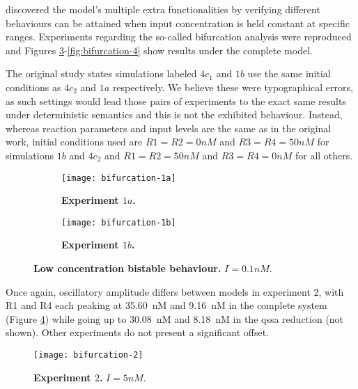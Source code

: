    \citet{multif} discovered the model's multiple extra functionalities by verifying different behaviours can be attained when input concentration is held constant at specific ranges.
    Experiments regarding the so-called bifurcation analysis were reproduced and Figures \ref{fig:bifurcation-1}-\ref{fig:bifurcation-4} show results under the complete model.

    The original study states simulations labeled $4c_{1}$ and $1b$ use the same initial conditions as $4c_{2}$ and $1a$ respectively.
    We believe these were typographical errors, as such settings would lead those pairs of experiments to the exact same results under deterministic semantics and this is not the exhibited behaviour.
    Instead, whereas reaction parameters and input levels are the same as in the original work, initial conditions used are $R1=R2=0nM$ and $R3=R4=50nM$ for simulations $1b$ and $4c_{2}$ and $R1=R2=50nM$ and $R3=R4=0nM$ for all others.

    \begin{figure}[!htbp]
      \centering
      \begin{subfigure}[t]{0.85\textwidth}
        \centering
        \texttt{[image: bifurcation-1a]}
        \caption{\textbf{Experiment $1a$.}}
        \label{fig:bifurcation-1a}
      \end{subfigure}
      \begin{subfigure}[t]{0.85\textwidth}
        \centering
        \texttt{[image: bifurcation-1b]}
        \caption{\textbf{Experiment $1b$.}}
        \label{fig:bifurcation-1b}
      \end{subfigure}
      \caption{\textbf{Low concentration bistable behaviour.} $I = 0.1 nM$.}
      \label{fig:bifurcation-1}
    \end{figure}

    Once again, oscillatory amplitude differs between models in experiment $2$, with R1 and R4 each peaking at \SI{35.60}{\nano M} and \SI{9.16}{\nano M} in the complete system (Figure \ref{fig:bifurcation-2}) while going up to \SI{30.08}{\nano M} and \SI{8.18}{\nano M} in the \ac{qssa} reduction (not shown).
    Other experiments do not present a significant offset.

    \begin{figure}[!htbp]
      \centering
      \texttt{[image: bifurcation-2]}
      \caption{\textbf{Experiment $2$.} $I = 5 nM$.}
      \label{fig:bifurcation-2}
    \end{figure}

